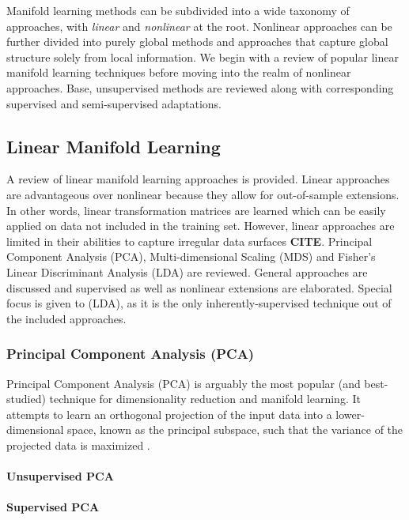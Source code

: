 Manifold learning methods can be subdivided into a wide taxonomy of approaches, with \textit{linear} and \textit{nonlinear} at the root. Nonlinear approaches can be further divided into purely global methods and approaches that capture global structure solely from local information.  We begin with a review of popular linear manifold learning techniques before moving into the realm of nonlinear approaches. Base, unsupervised methods are reviewed along with corresponding supervised and semi-supervised adaptations. 

\subsection{Linear Manifold Learning}
A review of linear manifold learning approaches is provided.  Linear approaches are advantageous over nonlinear because they allow for out-of-sample extensions.  In other words, linear transformation matrices are learned which can be easily applied on data not included in the training set.  However, linear approaches are limited in their abilities to capture irregular data surfaces \textbf{CITE}.  Principal Component Analysis (PCA), Multi-dimensional Scaling (MDS) and Fisher's Linear Discriminant Analysis (LDA) are reviewed.  General approaches are discussed and supervised as well as nonlinear extensions are elaborated. Special focus is given to (LDA), as it is the only inherently-supervised technique out of the included approaches.

\subsubsection{Principal Component Analysis (PCA)}

Principal Component Analysis (PCA) is arguably the most popular (and best-studied) technique for dimensionality reduction and manifold learning.  It attempts to learn an orthogonal projection of the input data into a lower-dimensional space, known as the principal subspace, such that the variance of the projected data is maximized \citep{Chao2019RecentAdvancesSupervisedDimRed}.

\paragraph{Unsupervised PCA}

\paragraph{Supervised PCA}

